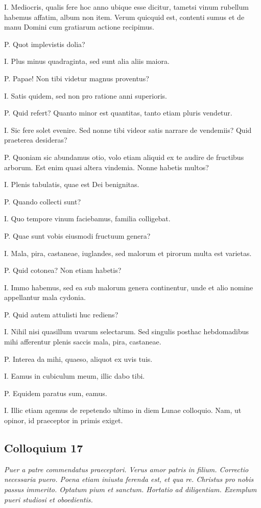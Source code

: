 \documentclass{article}
\begin{document}
I. Mediocris, qualis fere hoc anno ubique esse dicitur, tametsi vinum rubellum habemus affatim, album non item. Verum quicquid est, contenti sumus et de manu Domini cum gratiarum actione recipimus.

P. Quot implevistis dolia?

I. Plus minus quadraginta, sed sunt alia aliis maiora.

P. Papae! Non tibi videtur magnus proventus?

I. Satis quidem, sed non pro ratione anni superioris.

 
P. Quid refert? Quanto minor est quantitas, tanto etiam pluris vendetur.

I. Sic fere solet evenire. Sed nonne tibi videor satis narrare de vendemiis? Quid praeterea desideras?

P. Quoniam sic abundamus otio, volo etiam aliquid ex te audire de fructibus arborum. Est enim quasi altera vindemia. Nonne habetis multos?

I. Plenis tabulatis, quae est Dei benignitas.

P. Quando collecti sunt?

I. Quo tempore vinum faciebamus, familia colligebat.

P. Quae sunt vobis eiusmodi fructuum genera?

I. Mala, pira, castaneae, iuglandes, sed malorum et pirorum multa est varietas.

P. Quid cotonea? Non etiam habetis?

I. Immo habemus, sed ea sub malorum genera continentur, unde et alio nomine appellantur mala cydonia.

P. Quid autem attulisti huc rediens?

I. Nihil nisi quasillum uvarum selectarum. Sed singulis posthac hebdomadibus mihi afferentur plenis saccis mala, pira, castaneae.

P. Interea da mihi, quaeso, aliquot ex uvis tuis.

I. Eamus in cubiculum meum, illic dabo tibi.

P. Equidem paratus sum, eamus.

I. Illic etiam agemus de repetendo ultimo in diem Lunae colloquio. Nam, ut opinor, id praeceptor in primis exiget.

\subsection{Colloquium 17}
\emph{Puer a patre commendatus praeceptori. Verus amor patris in filium. Correctio necessaria puero. Poena etiam iniusta ferenda est, et qua re. Christus pro nobis passus immerito. Optatum pium et sanctum. Hortatio ad diligentiam. Exemplum pueri studiosi et oboedientis.}
\end{document}
